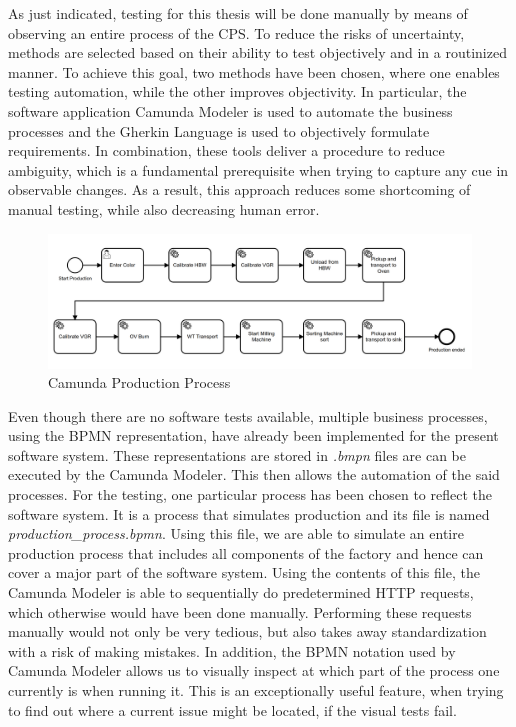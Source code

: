 As just indicated, testing for this thesis will be done manually by means of observing an entire process of the CPS. To reduce the risks of uncertainty, methods are selected based on their ability to test objectively and in a routinized manner. To achieve this goal, two methods have been chosen, where one enables testing automation, while the other improves objectivity. In particular, the software application Camunda Modeler is used to automate the business processes and the Gherkin Language is used to objectively formulate requirements. In combination, these tools deliver a procedure to reduce ambiguity, which is a fundamental prerequisite when trying to capture any cue in observable changes. As a result, this approach reduces some shortcoming of manual testing, while also decreasing human error.

\begin{figure}[htp]
    \centering
    \includegraphics[width=\textwidth]{./assets/camunda_process}
    \caption{Camunda Production Process}
\end{figure}

Even though there are no software tests available, multiple business processes, using the BPMN representation, have already been implemented for the present software system. These representations are stored in \emph{.bmpn} files are can be executed by the Camunda Modeler. This then allows the automation of the said processes.  For the testing, one particular process has been chosen to reflect the software system. It is a process that simulates production and its file is named \emph{production\_process.bpmn}. Using this file, we are able to simulate an entire production process that includes all components of the factory and hence can cover a major part of the software system. Using the contents of this file, the Camunda Modeler is able to sequentially do predetermined HTTP requests, which otherwise would have been done manually. Performing these requests manually would not only be very tedious, but also takes away standardization with a risk of making mistakes. In addition, the BPMN notation used by Camunda Modeler allows us to visually inspect at which part of the process one currently is when running it. This is an exceptionally useful feature, when trying to find out where a current issue might be located, if the visual tests fail.


